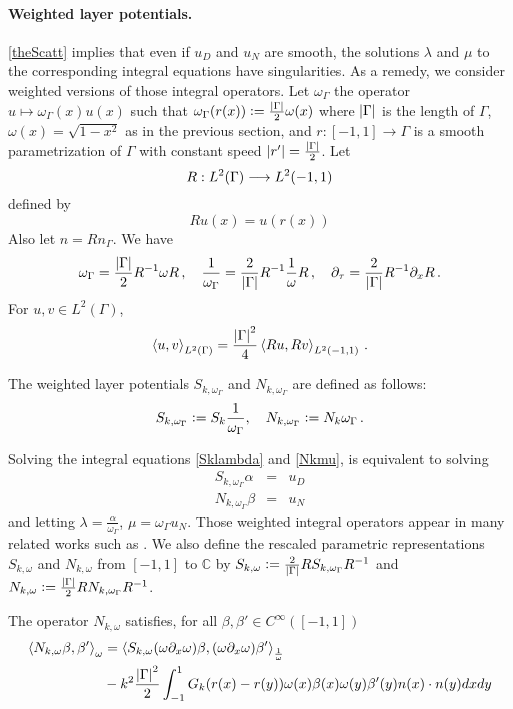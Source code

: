 \documentclass[a4paper]{article}
\begin{document}
\paragraph{Weighted layer potentials.} \autoref{theScatt} implies that even if $u_D$ and $u_N$ are smooth, the solutions $\lambda$ and $\mu$ to the corresponding integral equations have singularities. As a remedy, we consider weighted versions of those integral operators. Let $\omega_\Gamma$ the operator $u \mapsto \omega_\Gamma(x) u(x)$ such that $\omega_\Gamma(r(x)) \mathrel{\mathop:}= \frac{\left\lvert \Gamma \right\rvert}{2}\omega(x)$ where $\left\lvert \Gamma \right\rvert$ is the length of $\Gamma$, $\omega(x) = \sqrt{1 - x^2}$ as in the previous section, and $r : [-1,1] \to \Gamma$ is a smooth parametrization of $\Gamma$ with constant speed $\left\lvert r' \right\rvert = \frac{\left\lvert \Gamma \right\rvert}{2}$. Let 
\[R : L^2(\Gamma) \longrightarrow L^2(-1,1)\]
defined by 
\[Ru(x) = u(r(x))\]
Also let $n = Rn_\Gamma$. We have
\[\omega_\Gamma = \frac{\left\lvert \Gamma \right\rvert}{2}R^{-1} \omega R\,, \quad \frac{1}{\omega_\Gamma} = \frac{2}{\left\lvert \Gamma \right\rvert}R^{-1} \frac{1}{\omega} R\,, \quad \partial_\tau = \frac{2}{\left\lvert \Gamma \right\rvert} R^{-1}\partial_x R\,.\]
For $u,v \in L^2(\Gamma)$, 
\[\left\langle u,v\right\rangle_{L^2(\Gamma)} = \frac{\left\lvert \Gamma \right\rvert^2}{4}\left\langle Ru,Rv\right\rangle_{L^2(-1,1)} \,.\] 
\begin{Def}
	The weighted layer potentials $S_{k,\omega_\Gamma}$ and $N_{k,\omega_\Gamma}$ are defined as follows:
	\[S_{k,\omega_\Gamma} \mathrel{\mathop:}= S_k \frac{1}{\omega_\Gamma}, \quad N_{k,\omega_\Gamma} \mathrel{\mathop:}=  N_{k}\omega_\Gamma\,.\]
\end{Def}
Solving the integral equations \eqref{Sklambda} and \eqref{Nkmu}, is equivalent to solving
\begin{eqnarray*}
	S_{k,\omega_\Gamma} \alpha &=& u_D\\
	N_{k,\omega_\Gamma} \beta &=& u_N
\end{eqnarray*}
and letting $\lambda = \frac{\alpha}{\omega_\Gamma}$, $\mu = \omega_\Gamma u_N$. Those weighted integral operators appear in many related works such as \cite{bruno2012second,jerez2012explicit,jiang2004second}. 
We also define the rescaled parametric representations $S_{k,\omega}$ and $N_{k,\omega}$ from $[-1,1]$ to $\mathbb{C}$ by $S_{k,\omega} \mathrel{\mathop:}= \frac{2}{\left\lvert \Gamma \right\rvert} R S_{k,\omega_\Gamma}R^{-1}$ and $N_{k,\omega} \mathrel{\mathop:}= \frac{\left\lvert \Gamma \right\rvert}{2} R N_{k,\omega_\Gamma} R^{-1}$. 
\begin{Lem}
	The operator $N_{k,\omega}$ satisfies, for all $\beta, \beta' \in C^\infty([-1,1])$
	\[\begin{split}
		\left\langle N_{k,\omega} \beta,\beta'\right\rangle_\omega& = \left\langle S_{k,\omega}(\omega \partial_x \omega)\beta,(\omega \partial_x \omega) \beta'\right\rangle_\frac{1}{\omega}\\
		&-k^2 \frac{\left\lvert \Gamma \right\rvert^2}{2}\int_{-1}^{1} G_k(r(x) - r(y))\omega(x)\beta(x)\omega(y)\beta'(y) n(x) \cdot n(y) dx dy
	\end{split}\]
\end{Lem}
\end{document}
